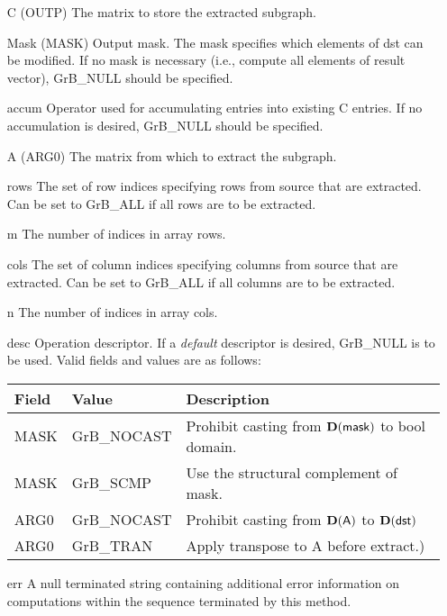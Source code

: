\begin{itemize}[leftmargin=1in]
    \item[{\sf C}]   ({\sf OUTP}) The matrix to store the extracted subgraph.

    \item[{\sf Mask}] ({\sf MASK}) Output mask. The mask
    specifies which elements of {\sf dst} can be modified.
    If no mask is necessary (i.e., compute all elements of result
    vector), {\sf GrB\_NULL} should be specified.

    \item[{\sf accum}]  Operator used for accumulating entries into existing {\sf C} entries. 
			If no accumulation is desired, {\sf GrB\_NULL} should be specified.

    \item[{\sf A}]   ({\sf ARG0}) The matrix from which to extract the subgraph.
    \item[{\sf rows}]     The set of row indices specifying rows from source that
                              are extracted. Can
                              be set to {\sf GrB\_ALL} if all rows are
                              to be extracted.
    \item[{\sf m}]     The number of indices in array {\sf rows}.
    \item[{\sf cols}]   The set of column indices specifying
                              columns from source that are extracted. Can
                              be set to {\sf GrB\_ALL} if all columns are
                              to be extracted.
    \item[{\sf n}]     The number of indices in array {\sf cols}.

    \item[{\sf desc}]   Operation descriptor. If a
    \emph{default} descriptor is desired, {\sf GrB\_NULL} is to be
    used.  Valid fields and values are as follows: \\
    \begin{tabular}{lll}
    Field  & Value & Description \\
    \hline
    {\sf MASK} & {\sf GrB\_NOCAST} & Prohibit casting from $\bold{D}({\sf mask})$ to {\sf bool} domain. \\
    {\sf MASK} & {\sf GrB\_SCMP}   & Use the structural complement of {\sf mask}. \\
    {\sf ARG0} & {\sf GrB\_NOCAST} & Prohibit casting from $\bold{D}({\sf A})$ to $\bold{D}({\sf dst})$ \\
    {\sf ARG0} & {\sf GrB\_TRAN}   & Apply transpose to {\sf A} before extract.) \\
    \end{tabular}
    \item[{\sf err}]     A null terminated string containing additional error
                         information on computations within the sequence 
                         terminated by this method. 
\end{itemize}

